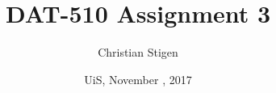 \documentclass[a4paper,english,12pt]{article}
\title{DAT-510 Assignment 3}
\author{Christian Stigen}
\date{UiS, November \nth{9}, 2017}
\begin{document}
\maketitle

\begin{abstract}
\end{abstract}



\end{document}
